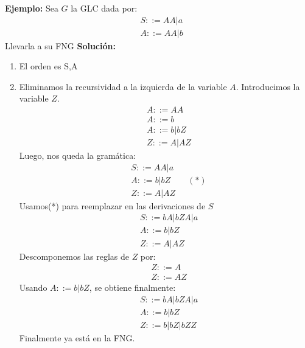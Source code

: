 \textbf{Ejemplo: }Sea $G$ la GLC dada por:
\begin{align*}
&S::=AA|a	\\
&A::=AA|b
\end{align*}
Llevarla a su FNG
\textbf{Solución: }
\begin{enumerate}
\item El orden es S,A
\item Eliminamos la recursividad a la izquierda de la variable $A$. Introducimos la variable $Z$.
\begin{align*}
&A::=AA	\\
&A::=b	\\
&A::=b|bZ	\\
&Z::=A|AZ
\end{align*}
Luego, nos queda la gramática:
\begin{align*}
&S::=AA|a	\\
&A::=b|bZ	\qquad(*)	\\
&Z::=A|AZ
\end{align*}
Usamos(*) para reemplazar en las derivaciones de $S$
\begin{align*}
&S::=bA|bZA|a	\\
&A::=b|bZ	\\
&Z::=A|AZ
\end{align*}
Descomponemos las reglas de $Z$ por: 
\begin{align*}
&Z::=A	\\
&Z::=AZ	
\end{align*}
Usando $A::=b|bZ$, se obtiene finalmente:
\begin{align*}
&S::=bA|bZA|a	\\
&A::=b|bZ	\\
&Z::=b|bZ|bZZ
\end{align*}
Finalmente ya está en la FNG.
\end{enumerate}